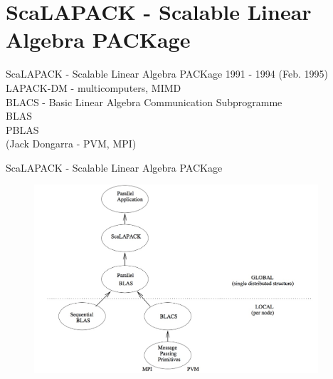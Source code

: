 \section{ScaLAPACK - Scalable Linear Algebra PACKage}
	\begin{frame}{ScaLAPACK - Scalable Linear Algebra PACKage}
		1991 - 1994 (Feb. 1995) \\
		LAPACK-DM - multicomputers, MIMD \\
		\vspace{5mm}
		BLACS - Basic Linear Algebra Communication Subprogramme \\
		BLAS \\
		PBLAS \\
		\vspace{5mm}
		(Jack Dongarra - PVM, MPI)
		\vspace{5mm}

	\end{frame}
	\begin{frame}{ScaLAPACK - Scalable Linear Algebra PACKage}
		\begin{figure}
			\includegraphics[height=7cm]{img/13/scalapack}
		\end{figure}
	\end{frame}
